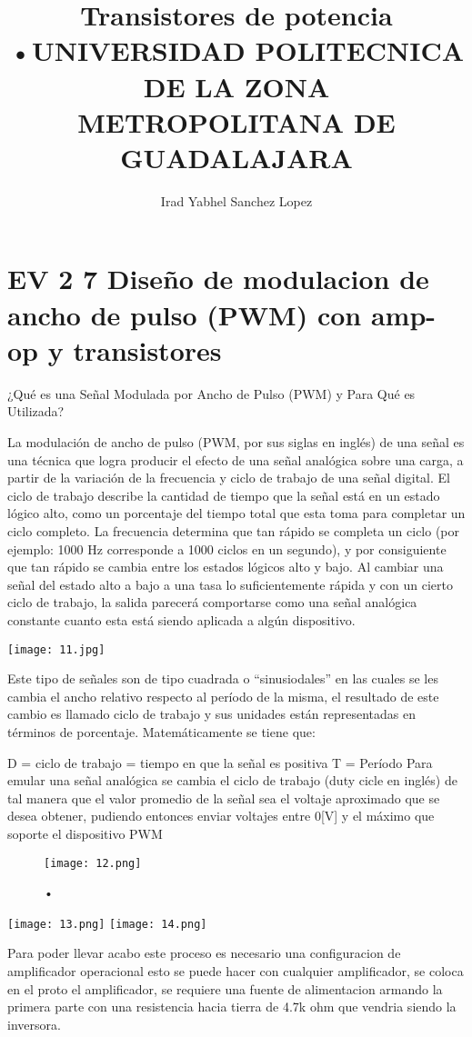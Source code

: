 \documentclass[10pt,a4paper]{article}
\author{Irad Yabhel Sanchez Lopez}
\title{Transistores de potencia }
\begin{document}
\title{•UNIVERSIDAD POLITECNICA DE LA ZONA METROPOLITANA DE GUADALAJARA}


\chapter{EV 2 7 Diseño de modulacion de ancho de pulso (PWM) con amp-op y transistores}


\begin{flushleft}
¿Qué es una Señal Modulada por Ancho de Pulso (PWM) y Para Qué es Utilizada?


La modulación de ancho de pulso (PWM, por sus siglas en inglés) de una señal es una técnica que logra producir el efecto de una señal analógica sobre una carga, a partir de la variación de la frecuencia y ciclo de trabajo de una señal digital. El ciclo de trabajo describe la cantidad de tiempo que la señal está en un estado lógico alto, como un porcentaje del tiempo total que esta toma para completar un ciclo completo. La frecuencia determina que tan rápido se completa un ciclo (por ejemplo: 1000 Hz corresponde a 1000 ciclos en un segundo), y por consiguiente que tan rápido se cambia entre los estados lógicos alto y bajo. Al cambiar una señal del estado alto a bajo a una tasa lo suficientemente rápida y con un cierto ciclo de trabajo, la salida parecerá comportarse como una señal analógica constante cuanto esta está siendo aplicada a algún dispositivo.

\texttt{[image: 11.jpg]} 

Este tipo de señales son de tipo cuadrada o “sinusiodales” en las cuales se les cambia el ancho relativo respecto al período de la misma, el resultado de este cambio es llamado ciclo de trabajo y sus unidades están representadas en términos de porcentaje. Matemáticamente se tiene que:
 
D = ciclo de trabajo
  = tiempo en que la señal es positiva
T = Período
Para emular una señal analógica se cambia el ciclo de trabajo (duty cicle en inglés) de tal manera que el valor promedio de la señal sea el voltaje aproximado que se desea obtener, pudiendo entonces enviar voltajes entre 0[V] y el máximo que soporte el dispositivo PWM

\begin{figure}[hbtp]
\caption{•}
\centering
\texttt{[image: 12.png]}
\end{figure}

\texttt{[image: 13.png]} 
\texttt{[image: 14.png]} 

Para poder llevar acabo este proceso es necesario una configuracion de amplificador operacional esto se puede hacer con cualquier amplificador, se coloca en el proto el amplificador, se requiere una fuente de alimentacion armando la primera parte con una resistencia hacia tierra de 4.7k ohm que vendria siendo la inversora.


\end{flushleft}
\end{document}

